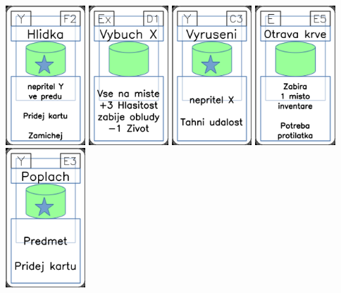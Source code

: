 \documentclass[a4paper]{article}
\begin{document}
	\includegraphics[width=3.0cm]{img-5_26}
	\includegraphics[width=3.0cm]{img-4_15}
	\includegraphics[width=3.0cm]{img-5_42}
	\includegraphics[width=3.0cm]{img-4_54}
	\includegraphics[width=3.0cm]{img-5_22}
\end{document}
